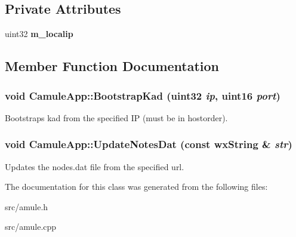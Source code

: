 \subsection*{Private Attributes}
\begin{DoxyCompactItemize}
\item 
uint32 {\bfseries m\_\-localip}\label{classCamuleApp_a213109bac9e1f34a52e9cc2084c70400}

\end{DoxyCompactItemize}


\subsection{Member Function Documentation}
\subsubsection[{BootstrapKad}]{\setlength{\rightskip}{0pt plus 5cm}void CamuleApp::BootstrapKad (uint32 {\em ip}, \/  uint16 {\em port})}\label{classCamuleApp_a2db6a00c17f7ceb8f30a81bb74439e72}


Bootstraps kad from the specified IP (must be in hostorder). 
\subsubsection[{UpdateNotesDat}]{\setlength{\rightskip}{0pt plus 5cm}void CamuleApp::UpdateNotesDat (const wxString \& {\em str})}\label{classCamuleApp_a53eca5c2052b392bbcef967cc13a9e2f}


Updates the nodes.dat file from the specified url. 

The documentation for this class was generated from the following files:\begin{DoxyCompactItemize}
\item 
src/amule.h\item 
src/amule.cpp\end{DoxyCompactItemize}
